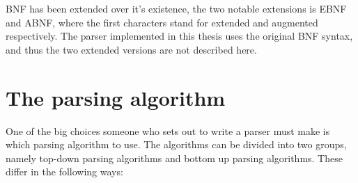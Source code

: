 BNF has been extended over it's existence, the two notable extensions is EBNF and ABNF, where the first characters stand for extended and augmented respectively. The parser implemented in this thesis uses the original BNF syntax, and thus the two extended versions are not described here.
\section{The parsing algorithm}
One of the big choices someone who sets out to write a parser must make is which parsing algorithm to use. The algorithms can be divided into two groups, namely top-down parsing algorithms and bottom up parsing algorithms. These differ in the following ways:
